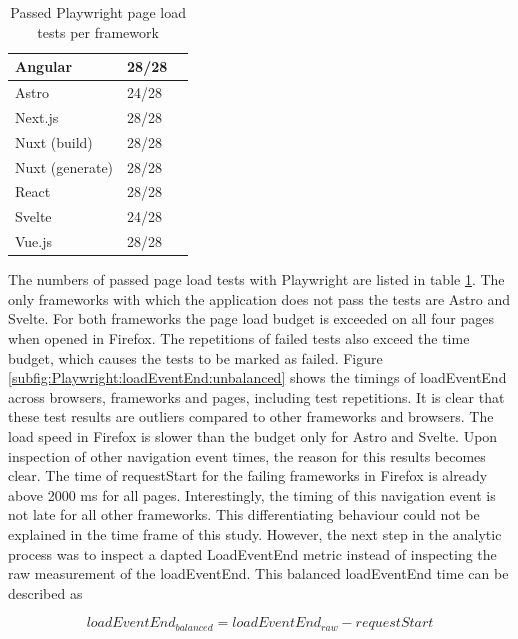 \documentclass[a4paper, 12pt]{article}
\begin{document}
\begin{table}[!ht]
  \centering
  \begin{tabular}{|l|l|l|}
    \hline
    Angular         & 28/28 \\ \hline
    Astro           & 24/28 \\ \hline
    Next.js         & 28/28 \\ \hline
    Nuxt (build)    & 28/28 \\ \hline
    Nuxt (generate) & 28/28 \\ \hline
    React           & 28/28 \\ \hline
    Svelte          & 24/28 \\ \hline
    Vue.js          & 28/28 \\ \hline
  \end{tabular}
  \caption{Passed Playwright page load tests per framework}
  \label{tab:playwright:pageLoad}
\end{table}

The numbers of passed page load tests with Playwright are listed in table \ref{tab:playwright:pageLoad}.
The only frameworks with which the application does not pass the tests are Astro and Svelte.
For both frameworks the page load budget is exceeded on all four pages when opened in Firefox.
The repetitions of failed tests also exceed the time budget, which causes the tests to be marked as failed.
Figure \ref{subfig:Playwright:loadEventEnd:unbalanced} shows the timings of loadEventEnd across browsers, frameworks and pages, including test repetitions.
It is clear that these test results are outliers compared to other frameworks and browsers.
The load speed in Firefox is slower than the budget only for Astro and Svelte.
Upon inspection of other navigation event times, the reason for this results becomes clear.
The time of requestStart for the failing frameworks in Firefox is already above 2000 ms for all pages.
Interestingly, the timing of this navigation event is not late for all other frameworks.
This differentiating behaviour could not be explained in the time frame of this study.
However, the next step in the analytic process was to inspect a dapted LoadEventEnd metric instead of inspecting the raw measurement of the loadEventEnd.
This balanced loadEventEnd time can be described as

\begin{equation}
\mathit{loadEventEnd}_\mathit{balanced} = \mathit{loadEventEnd}_\mathit{raw} - \mathit{requestStart}
\end{equation}
\vspace{0cm}
\end{document}
